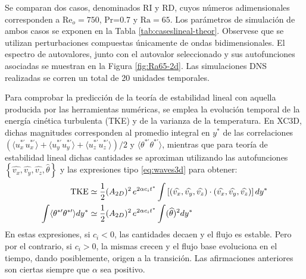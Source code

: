 Se comparan dos casos, denominados RI y RD, cuyos números adimensionales corresponden a $\text{Re}_o=750$, Pr=0.7 y $\text{Ra}=65$. Los parámetros de simulación de ambos casos se exponen en la Tabla \ref{tab:caseslineal-theor}. Observese que se utilizan perturbaciones compuestas únicamente de ondas bidimensionales. El espectro de autovalores, junto con el autovalor seleccionado y sus autofunciones asociadas se muestran en la Figura \ref{fig:Ra65-2d}. Las simulaciones DNS realizadas se corren un total de 20 unidades temporales.

\begin{table}[H]
\centering
{}
\caption{Parámetros de simulación de los dos casos elegidos.}
\label{tab:caseslineal-theor}
\end{table}

Para comprobar la predicción de la teoría de estabilidad lineal con aquella producida por las herramientas numéricas, se emplea la evolución temporal de la energía cinética turbulenta (TKE) y de la varianza de la temperatura. En XC3D, dichas magnitudes corresponden al promedio integral en $y^*$ de las correlaciones $( \langle u^{* \prime}_x u^{* \prime}_x \rangle + \langle u^{* \prime}_y u^{* \prime}_y  \rangle + \langle u^{* \prime}_z u^{* \prime}_z  \rangle) / 2$ y $\langle \theta^{* \prime} \theta^{* \prime} \rangle$, mientras que para teoría de estabilidad lineal dichas cantidades se aproximan utilizando las autofunciones $\left\lbrace \widehat{v_x}, \widehat{v_y}, \widehat{v_z}, \widehat{\theta} \right\rbrace$ y las expresiones tipo \ref{eq:waves3d} para obtener:
\begin{align}
\text{TKE} &\simeq \frac{1}{2} (A_{2D})^2 \hspace*{0.5mm} e^{2 \alpha c_i t^*} \int \left[  ( \widehat{v_x}, \widehat{v_y}, \widehat{v_z} ) \cdot ( \widehat{v_x}, \widehat{v_y}, \widehat{v_z} )  \right] dy^* \\
\int \langle \theta^{* \prime} \theta^{* \prime} \rangle dy^* &\simeq \frac{1}{2} (A_{2D})^2 \hspace*{0.5mm} e^{2 \alpha c_i t^*} \int (\widehat{\theta})^2 dy^*
\end{align}   
En estas expresiones, si $c_i < 0$, las cantidades decaen y el flujo es estable. Pero por el contrario, si $c_i > 0$, la mismas crecen y el flujo base evoluciona en el tiempo, dando posiblemente, origen a la transición. Las afirmaciones anteriores son ciertas siempre que $\alpha$ sea positivo.

